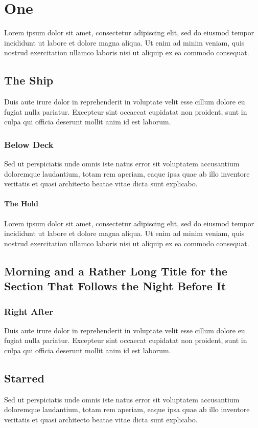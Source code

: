 \documentclass[11pt,oneside]{memoir}
\begin{document}
\chapter{One}
Lorem ipsum dolor sit amet, consectetur adipiscing elit, sed do eiusmod tempor incididunt ut labore et dolore magna aliqua. Ut enim ad minim veniam, quis nostrud exercitation ullamco laboris nisi ut aliquip ex ea commodo consequat.
\section{The Ship}
Duis aute irure dolor in reprehenderit in voluptate velit esse cillum dolore eu fugiat nulla pariatur. Excepteur sint occaecat cupidatat non proident, sunt in culpa qui officia deserunt mollit anim id est laborum.
\subsection{Below Deck}
Sed ut perspiciatis unde omnis iste natus error sit voluptatem accusantium doloremque laudantium, totam rem aperiam, eaque ipsa quae ab illo inventore veritatis et quasi architecto beatae vitae dicta sunt explicabo.
\subsubsection{The Hold}
Lorem ipsum dolor sit amet, consectetur adipiscing elit, sed do eiusmod tempor incididunt ut labore et dolore magna aliqua. Ut enim ad minim veniam, quis nostrud exercitation ullamco laboris nisi ut aliquip ex ea commodo consequat.
\section{Morning and a Rather Long Title for the Section That Follows the Night Before It}
\subsection{Right After}
Duis aute irure dolor in reprehenderit in voluptate velit esse cillum dolore eu fugiat nulla pariatur. Excepteur sint occaecat cupidatat non proident, sunt in culpa qui officia deserunt mollit anim id est laborum.
\section*{Starred}
Sed ut perspiciatis unde omnis iste natus error sit voluptatem accusantium doloremque laudantium, totam rem aperiam, eaque ipsa quae ab illo inventore veritatis et quasi architecto beatae vitae dicta sunt explicabo.
\end{document}
